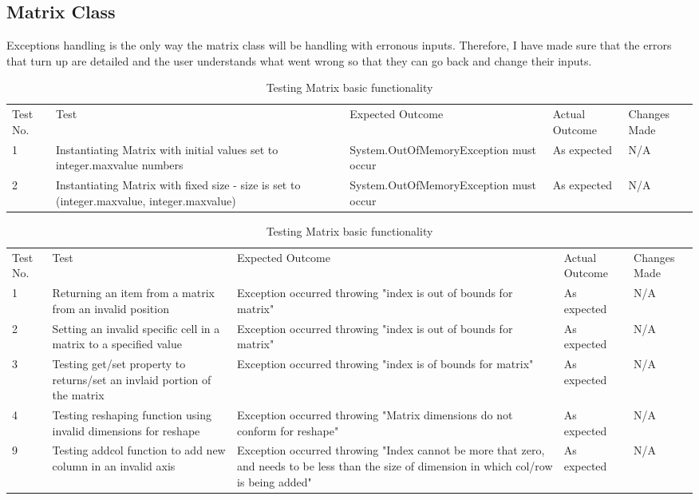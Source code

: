 \subsection{Matrix Class}
Exceptions handling is the only way the matrix class will be handling with erronous inputs. Therefore, I have made sure that the errors that turn up are detailed and the user understands what went wrong so that they can go back and change their inputs.

\begin{table}[H]
\centering
    \begin{tabular}{|p{1cm}|p{4cm}|p{4cm}|p{3cm}|p{2cm}|}
        \hline
        Test No. & Test & Expected Outcome & Actual Outcome & Changes Made \\ \cline{1-5} 
        1 & Instantiating Matrix with initial values set to integer.maxvalue numbers & System.OutOfMemoryException must occur & As expected & N/A \\
        \cline{1-5}
        2 & Instantiating Matrix with fixed size - size is set to (integer.maxvalue, integer.maxvalue) & System.OutOfMemoryException must occur & As expected & N/A \\
        \cline{1-5}
    \end{tabular}
    \caption{Testing Matrix Constructors}
    \vspace{0.5cm}

    \begin{tabular}{|p{1cm}|p{4cm}|p{4cm}|p{3cm}|p{2cm}|}
        \hline
        Test No. & Test & Expected Outcome & Actual Outcome & Changes Made \\ \cline{1-5} 
        1 & Returning an item from a matrix from an invalid position & Exception occurred throwing "index is out of bounds for matrix" & As expected & N/A \\
        \cline{1-5}
        2 & Setting an invalid specific cell in a matrix to a specified value & Exception occurred throwing "index is out of bounds for matrix" & As expected & N/A \\
        \cline{1-5}
        3 & Testing get/set property to returns/set an invlaid portion of the matrix & Exception occurred throwing "index is of bounds for matrix" & As expected & N/A \\
        \cline{1-5}
        4 & Testing reshaping function using invalid dimensions for reshape & Exception occurred throwing "Matrix dimensions do not conform for reshape" & As expected & N/A \\
        \cline{1-5}
        9 & Testing addcol function to add new column in an invalid axis & Exception occurred throwing "Index cannot be more that zero, and needs to be less than the size of dimension in which col/row is being added" & As expected & N/A \\
        \cline{1-5}
    \end{tabular}
    \caption{Testing Matrix basic functionality}
\end{table}

